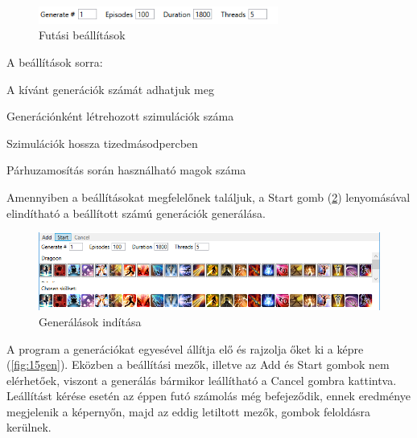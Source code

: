 \documentclass[12pt]{article}
\begin{document}
\begin{figure}[H]
	\begin{center}
		\includegraphics[width=0.7\textwidth]{options}
	\end{center}
	\caption{Futási beállítások}
	\label{fig:options}
\end{figure}

A beállítások sorra:

\begin{description}[align=right,labelwidth=3cm]
	 \item [Generate] A kívánt generációk számát adhatjuk meg
	 \item [Episodes] Generációnként létrehozott szimulációk száma
	 \item [Duration] Szimulációk hossza tizedmásodpercben
	 \item [Threads] Párhuzamosítás során használható magok száma
\end{description}

Amennyiben a beállításokat megfelelőnek találjuk, a Start gomb (\ref{fig:startgen}) lenyomásával elindítható a beállított számú generációk generálása. 

\begin{figure}[H]
	\begin{center}
		\includegraphics[width=1\textwidth]{startgen}
	\end{center}
	\caption{Generálások indítása}
	\label{fig:startgen}
\end{figure}

A program a generációkat egyesével állítja elő és rajzolja őket ki a képre (\ref{fig:15gen}). Eközben a beállítási mezők, illetve az Add és Start gombok nem elérhetőek, viszont a generálás bármikor leállítható a Cancel gombra kattintva.
Leállítást kérése esetén az éppen futó számolás még befejeződik, ennek eredménye megjelenik a képernyőn, majd az eddig letiltott mezők, gombok feloldásra kerülnek.
\end{document}
